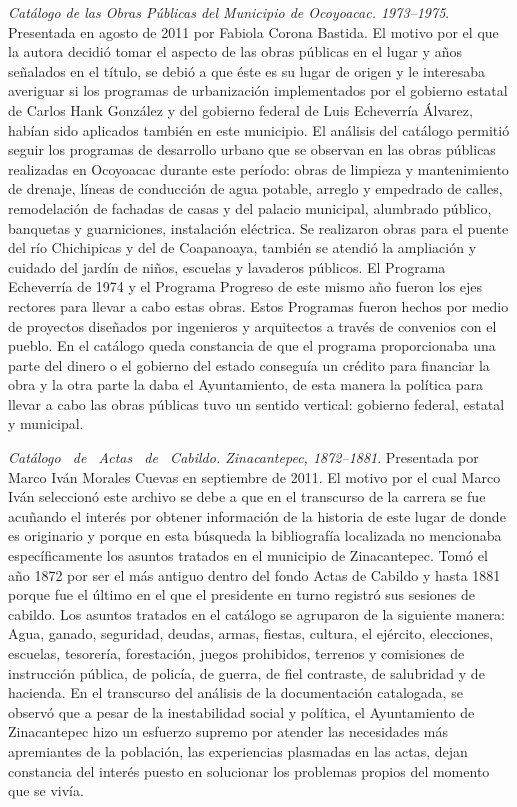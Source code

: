 \smallskip 
\noindent \textsl{Catálogo de las Obras Públicas del 
Municipio de Ocoyoacac. 1973--1975}. Presentada en agosto de 2011 por 
Fabiola Corona Bastida. El  motivo por el que la autora decidió tomar 
el aspecto de las obras públicas en el lugar y años señalados en el 
título, se debió a que éste es su lugar de origen y le interesaba 
averiguar si los programas de urbanización implementados por el 
gobierno estatal de Carlos Hank González y del gobierno federal de Luis 
Echeverría Álvarez, habían sido aplicados también en este municipio. El 
análisis del catálogo permitió seguir los programas de desarrollo 
urbano que se observan en las obras públicas realizadas en Ocoyoacac 
durante este período: obras de limpieza y mantenimiento de 
drenaje, líneas de conducción de agua potable, arreglo y empedrado de 
calles, remodelación de fachadas de casas y del palacio municipal, 
alumbrado público, banquetas y guarniciones, instalación eléctrica. Se 
realizaron obras para el puente del río Chichipicas y del de 
Coapanoaya, también se atendió la ampliación y cuidado del jardín de  
niños, escuelas y lavaderos públicos. El Programa Echeverría de 1974 y 
el Programa Progreso de este mismo año fueron los ejes rectores para 
llevar a cabo estas obras. Estos Programas fueron hechos por medio de 
proyectos diseñados por ingenieros y arquitectos a través de convenios 
con el pueblo. En el catálogo queda constancia de que el programa 
proporcionaba una parte del dinero o el gobierno del estado conseguía 
un crédito para financiar la obra y la otra parte la daba el 
Ayuntamiento, de esta manera la política para llevar a cabo las obras 
públicas tuvo un sentido vertical: gobierno federal, estatal y 
municipal.
\enlargethispage{\baselineskip}

\smallskip 
\noindent \textsl{Catálogo \ de \ Actas \ de \ Cabildo. 
Zi\-na\-can\-te\-pec, 1872--1881}. Presentada por Marco Iván Morales Cuevas en 
septiembre de 2011. El motivo por el cual Marco Iván seleccionó este 
archivo se debe a que en el transcurso de la carrera se fue acuñando 
el interés por obtener información de la historia de este lugar de 
donde es originario y porque en esta búsqueda la bibliografía 
localizada no mencionaba específicamente los asuntos tratados en el 
municipio de Zinacantepec. Tomó el año 1872 por ser el más antiguo 
dentro del fondo  Actas de Cabildo y hasta 1881 porque fue el último  
en el que el presidente en turno registró sus sesiones de cabildo. Los 
asuntos tratados en el catálogo se agruparon de la siguiente manera: 
Agua, ganado, seguridad, deudas, armas, fiestas, cultura, el ejército, 
elecciones, escuelas, tesorería, forestación, juegos prohibidos, 
terrenos y comisiones de instrucción pública, de policía, de guerra, de 
fiel contraste, de salubridad y de hacienda. En el transcurso del 
análisis de la documentación catalogada, se observó que a pesar de la 
inestabilidad social y política, el Ayuntamiento de Zinacantepec hizo 
un esfuerzo supremo por atender las necesidades más apremiantes de la 
población, las experiencias plasmadas en las actas, dejan constancia 
del interés puesto en solucionar los problemas propios del  momento que 
se vivía.

